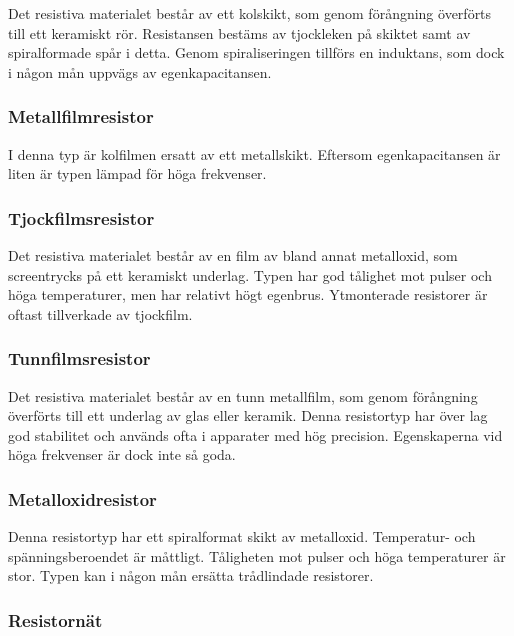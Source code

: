 Det resistiva materialet består av ett kolskikt, som genom förångning överförts
till ett keramiskt rör.
Resistansen bestäms av tjockleken på skiktet samt av spiralformade spår i
detta.
Genom spiraliseringen tillförs en induktans, som dock i någon mån uppvägs av
egenkapacitansen.

\subsubsection{Metallfilmresistor}

I denna typ är kolfilmen ersatt av ett metallskikt.
Eftersom egenkapacitansen är liten är typen lämpad för höga frekvenser.

\subsubsection{Tjockfilmsresistor}

Det resistiva materialet består av en film av bland annat metalloxid, som
screentrycks på ett keramiskt underlag.
Typen har god tålighet mot pulser och höga temperaturer, men har relativt högt
egenbrus.
Ytmonterade resistorer är oftast tillverkade av tjockfilm.

\subsubsection{Tunnfilmsresistor}

Det resistiva materialet består av en tunn metallfilm, som genom förångning
överförts till ett underlag av glas eller keramik. Denna resistortyp har över
lag god stabilitet och används ofta i apparater med hög precision.
Egenskaperna vid höga frekvenser är dock inte så goda.

\subsubsection{Metalloxidresistor}

Denna resistortyp har ett spiralformat skikt av metalloxid.
Temperatur- och spänningsberoendet är måttligt.
Tåligheten mot pulser och höga temperaturer är stor.
Typen kan i någon mån ersätta trådlindade resistorer.

\subsubsection{Resistornät}

